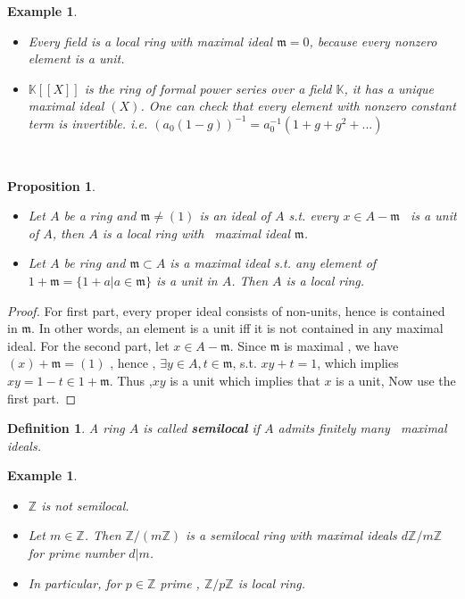 \documentclass[11pt]{article}
\newtheorem{prop}[thm]{Proposition}
\newtheorem{dfn}[thm]{Definition}
\newtheorem{ex}[thm]{Example}
\newcommand{\intg}{\mathbb Z}
\newcommand{\bbk}{\mathbb K}
\newcommand{\scm}{{\mathfrak m}}
\begin{document}
\begin{ex}
\ 
\begin{itemize}
\item
Every field is a local ring with maximal ideal $\scm=0$, because every nonzero element is a unit.
\item
$\bbk[[X]]$ is the ring of formal power series over a field $\bbk$, it has a unique maximal ideal $(X)$. One can check that every element with nonzero constant term is invertible. i.e. $(a_0(1-g))^{-1}=a_0^{-1}(1+g+g^2+...)$
\end{itemize}
\end{ex}
 
\begin{prop}\ 
\begin{itemize}
\item 
Let $A$ be a ring and $\scm\neq (1)$ is an ideal of $A$ s.t. every $x\in A-\scm$  is a unit of $A$, then $A$ is a local ring with  maximal ideal $\scm$.
\item
Let $A$ be ring and $\scm\subset A$ is a maximal ideal s.t. any element of $1+\scm=\{1+a|a\in \scm \}$ is a unit in $A$. Then $A$ is a local ring.
\end{itemize}
\end{prop}

\begin{proof}
For first part, every proper ideal consists of non-units, hence is contained in $\scm$. In other words, an element is a unit iff it is not contained in any maximal ideal.
For the second part, let $x\in A-\scm$. Since $\scm$ is maximal , we have $(x)+\scm=(1)$ , hence , $\exists y\in A, t\in \scm$, s.t. $xy+t=1$, which implies $xy=1-t\in 1+\scm.$ Thus ,$xy$ is a unit which implies that $x$ is a unit, Now use the first part.
\end{proof}

\begin{dfn}
A ring $A$ is called \textbf{semilocal} if $A$ admits finitely many  maximal ideals.
\end{dfn}

\begin{ex}\ 
\begin{itemize}
\item 
$\intg$ is not semilocal.
\item
Let $m\in \intg$. Then $\intg/(m\intg)$ is a semilocal ring with maximal ideals $ d\intg/m\intg$ for prime number $d|m$.
\item In particular, for $p\in \intg$ prime , $\intg/p \intg$ is local ring.
\end{itemize}
\end{ex}
\end{document}
